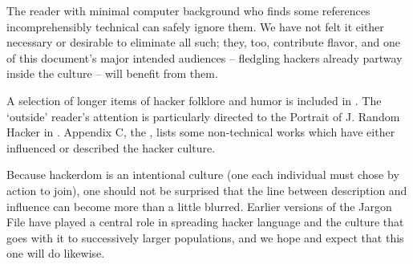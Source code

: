 The reader with minimal computer background who finds some references
incomprehensibly technical can safely ignore them. We have not felt it either
necessary or desirable to eliminate all such; they, too, contribute flavor, and
one of this document's major intended audiences -- fledgling hackers already
partway inside the culture -- will benefit from them.

A selection of longer items of hacker folklore and humor is included in
. The `outside' reader's attention is particularly
directed to the Portrait of J. Random Hacker in .
Appendix C, the , lists some non-technical works
which have either influenced or described the hacker culture.

Because hackerdom is an intentional culture (one each individual must chose by
action to join), one should not be surprised that the line between description
and influence can become more than a little blurred. Earlier versions of the
Jargon File have played a central role in spreading hacker language and the
culture that goes with it to successively larger populations, and we hope and
expect that this one will do likewise.

